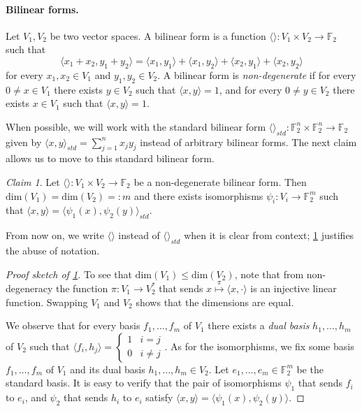 \documentclass[10pt,a4paper]{article}
\newcommand{\prettyref}[1]{\cref{#1}}
\theoremstyle{definition}
\theoremstyle{remark}
\newtheorem{claim}[theorem]{Claim}
\newcommand{\iprod}[1]{\langle#1\rangle}
\def\dim{\mathrm{ dim}}
\newcommand{\F}{\mathbb{F}}
\renewcommand{\leq}{\leqslant}
\numberwithin{equation}{section}
\let\origparagraph\paragraph
\renewcommand{\paragraph}[1]{\origparagraph{#1.}}
\let\pref=\prettyref
\begin{document}
\paragraph{Bilinear forms}Let \(V_1,V_2\) be two vector spaces. A bilinear form is a function \(\iprod{}:V_1 \times V_2 \to \F_2\) such that \[\iprod{x_1 + x_2,y_1 + y_2} = \iprod{x_1,y_1}+\iprod{x_1,y_2}+\iprod{x_2,y_1}+\iprod{x_2,y_2}\] 
for every \(x_1,x_2 \in V_1\) and \(y_1,y_2 \in V_2\). A bilinear form is \emph{non-degenerate} if for every \(0 \ne x \in V_1\) there exists \(y \in V_2\) such that \(\iprod{x,y}=1\), and for every \(0 \ne y \in V_2\) there exists \(x \in V_1\) such that \(\iprod{x,y}=1\).

When possible, we will work with the standard bilinear form \(\iprod{}_{std}:\F_2^n \times \F_2^n \to \F_2\) given by \(\iprod{x,y}_{std} = \sum_{j=1}^n x_j y_j\) instead of arbitrary bilinear forms. The next claim allows us to move to this standard bilinear form.
\begin{claim} \label{claim:always-work-with-standard}
    Let \(\iprod{}:V_1 \times V_2 \to \F_2\) be a non-degenerate bilinear form. Then \(\dim(V_1) = \dim(V_2) =: m\) and there exists isomorphisms \(\psi_i:V_i \to \F_2^m\) such that \(\iprod{x,y} = \iprod{\psi_1(x),\psi_2(y)}_{std}\).
\end{claim}
From now on, we write \(\iprod{}\) instead of \(\iprod{}_{std}\) when it is clear from context; \pref{claim:always-work-with-standard} justifies the abuse of notation.
\begin{proof}[Proof sketch of \pref{claim:always-work-with-standard}]
    To see that \(\dim(V_1) \leq \dim(V_2)\), note that from non-degeneracy the function \(\pi:V_1 \to V_2^*\) that sends \(x \overset{\pi}{\mapsto} \iprod{x, \cdot}\) is an injective linear function. Swapping \(V_1\) and \(V_2\) shows that the dimensions are equal. 
    
    We observe that for every basis \(f_1,\dots,f_m\) of \(V_1\) there exists a \emph{dual basis} \(h_1,\dots,h_m\) of \(V_2\) such that \(\iprod{f_i, h_j} = \begin{cases}
        1 & i=j \\ 0 & i \ne j
    \end{cases}\).
    As for the isomorphisms, we fix some basis \(f_1,\dots,f_m\) of \(V_1\) and its dual basis \(h_1,\dots,h_m \in V_2\). Let \(e_1,\dots,e_m \in \F_2^m\) be the standard basis. It is easy to verify that the pair of isomorphisms \(\psi_1\) that sends \(f_i\) to \(e_i\), and \(\psi_2\) that sends \(h_i\) to \(e_i\) satisfy \(\iprod{x,y} = \iprod{\psi_1(x),\psi_2(y)}\).
\end{proof}
\end{document}
